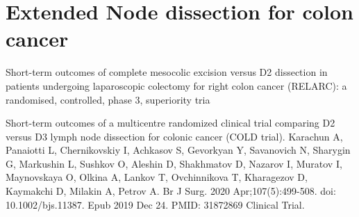 \documentclass[
]{book}
\begin{document}
\hypertarget{extended-node-dissection-for-colon-cancer}{%
\chapter{Extended Node dissection for colon cancer}\label{extended-node-dissection-for-colon-cancer}}

Short-term outcomes of complete mesocolic excision versus D2 dissection in patients undergoing laparoscopic colectomy for right colon cancer (RELARC): a randomised, controlled, phase 3, superiority tria

Short-term outcomes of a multicentre randomized clinical trial comparing D2 versus D3 lymph node dissection for colonic cancer (COLD trial).
Karachun A, Panaiotti L, Chernikovskiy I, Achkasov S, Gevorkyan Y, Savanovich N, Sharygin G, Markushin L, Sushkov O, Aleshin D, Shakhmatov D, Nazarov I, Muratov I, Maynovskaya O, Olkina A, Lankov T, Ovchinnikova T, Kharagezov D, Kaymakchi D, Milakin A, Petrov A.
Br J Surg. 2020 Apr;107(5):499-508. doi: 10.1002/bjs.11387. Epub 2019 Dec 24.
PMID: 31872869 Clinical Trial.

  
\end{document}
